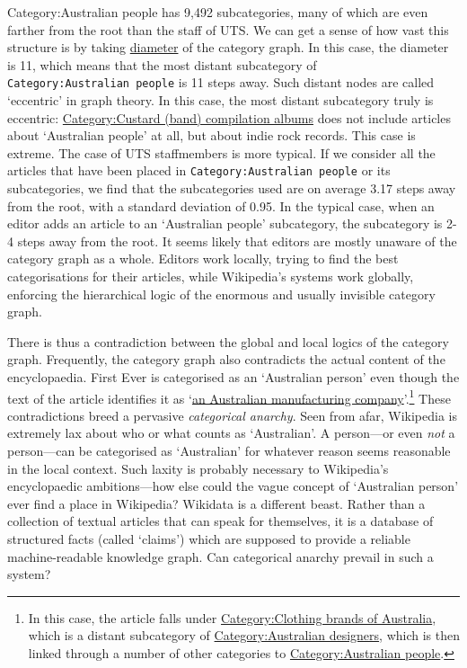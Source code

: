 \documentclass[
  a4paper,
  DIV=11,
  numbers=noendperiod]{scrreprt}
\begin{document}
Category:Australian people has 9,492 subcategories, many of which are
even farther from the root than the staff of UTS. We can get a sense of
how vast this structure is by taking
\href{https://en.wikipedia.org/wiki/Distance_(graph_theory)\#Related_concepts}{diameter}
of the category graph. In this case, the diameter is 11, which means
that the most distant subcategory of
\texttt{Category:Australian\ people} is 11 steps away. Such distant
nodes are called `eccentric' in graph theory. In this case, the most
distant subcategory truly is eccentric:
\href{https://en.wikipedia.org/wiki/Category:Custard\%20(band)\%20compilation\%20albums}{Category:Custard
(band) compilation albums} does not include articles about `Australian
people' at all, but about indie rock records. This case is extreme. The
case of UTS staffmembers is more typical. If we consider all the
articles that have been placed in \texttt{Category:Australian\ people}
or its subcategories, we find that the subcategories used are on average
3.17 steps away from the root, with a standard deviation of 0.95. In the
typical case, when an editor adds an article to an `Australian people'
subcategory, the subcategory is 2-4 steps away from the root. It seems
likely that editors are mostly unaware of the category graph as a whole.
Editors work locally, trying to find the best categorisations for their
articles, while Wikipedia's systems work globally, enforcing the
hierarchical logic of the enormous and usually invisible category graph.

There is thus a contradiction between the global and local logics of the
category graph. Frequently, the category graph also contradicts the
actual content of the encyclopaedia. First Ever is categorised as an
`Australian person' even though the text of the article identifies it as
`\href{https://en.wikipedia.org/w/index.php?title=First_Ever\&oldid=1177339020}{an
Australian manufacturing company}'.\footnote{In this case, the article
  falls under
  \href{https://en.wikipedia.org/w/index.php?title=Category:Clothing_brands_of_Australia\&oldid=938233678}{Category:Clothing
  brands of Australia}, which is a distant subcategory of
  \href{https://en.wikipedia.org/w/index.php?title=Category:Australian_designers\&oldid=921932361}{Category:Australian
  designers}, which is then linked through a number of other categories
  to
  \href{https://en.wikipedia.org/w/index.php?title=Category:Australian_people\&oldid=1148961840}{Category:Australian
  people}.} These contradictions breed a pervasive \emph{categorical
anarchy}. Seen from afar, Wikipedia is extremely lax about who or what
counts as `Australian'. A person---or even \emph{not} a person---can be
categorised as `Australian' for whatever reason seems reasonable in the
local context. Such laxity is probably necessary to Wikipedia's
encyclopaedic ambitions---how else could the vague concept of
`Australian person' ever find a place in Wikipedia? Wikidata is a
different beast. Rather than a collection of textual articles that can
speak for themselves, it is a database of structured facts (called
`claims') which are supposed to provide a reliable machine-readable
knowledge graph. Can categorical anarchy prevail in such a system?
\end{document}
